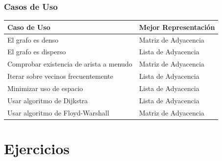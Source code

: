 \documentclass[11pt]{beamer}
\begin{document}
\begin{frame}\frametitle{Casos de Uso}
\centering
\begin{tabular}{@{} p{} l @{}}
\toprule
\textbf{Caso de Uso} & \textbf{Mejor Representación} \\
\midrule
El grafo es denso & Matriz de Adyacencia \\
El grafo es disperso & Lista de Adyacencia \\
Comprobar existencia de arista a menudo & Matriz de Adyacencia \\
Iterar sobre vecinos frecuentemente & Lista de Adyacencia \\
Minimizar uso de espacio & Lista de Adyacencia \\
Usar algoritmo de Dijkstra & Lista de Adyacencia \\
Usar algoritmo de Floyd-Warshall & Matriz de Adyacencia \\
\bottomrule
\end{tabular}
\end{frame}

\section{Ejercicios}
\end{document}
